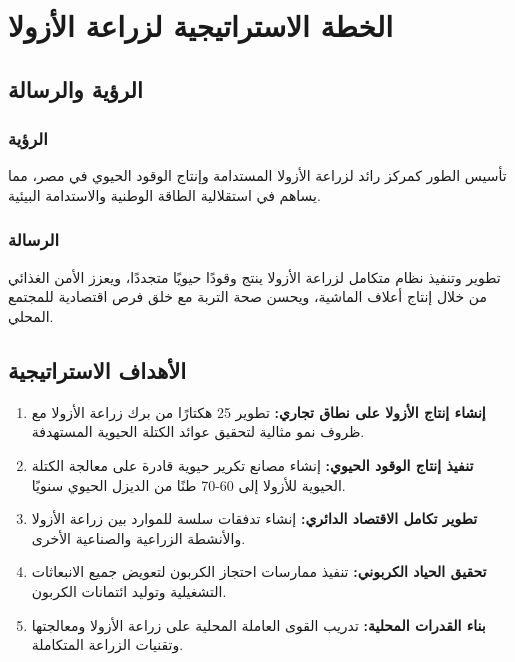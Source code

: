 \section{الخطة الاستراتيجية لزراعة الأزولا}

\subsection{الرؤية والرسالة}

\subsubsection{الرؤية}
تأسيس الطور كمركز رائد لزراعة الأزولا المستدامة وإنتاج الوقود الحيوي في مصر، مما يساهم في استقلالية الطاقة الوطنية والاستدامة البيئية.

\subsubsection{الرسالة}
تطوير وتنفيذ نظام متكامل لزراعة الأزولا ينتج وقودًا حيويًا متجددًا، ويعزز الأمن الغذائي من خلال إنتاج أعلاف الماشية، ويحسن صحة التربة مع خلق فرص اقتصادية للمجتمع المحلي.

\subsection{الأهداف الاستراتيجية}

\begin{enumerate}
    \item \textbf{إنشاء إنتاج الأزولا على نطاق تجاري:} تطوير 25 هكتارًا من برك زراعة الأزولا مع ظروف نمو مثالية لتحقيق عوائد الكتلة الحيوية المستهدفة.
    
    \item \textbf{تنفيذ إنتاج الوقود الحيوي:} إنشاء مصانع تكرير حيوية قادرة على معالجة الكتلة الحيوية للأزولا إلى 60-70 طنًا من الديزل الحيوي سنويًا.
    
    \item \textbf{تطوير تكامل الاقتصاد الدائري:} إنشاء تدفقات سلسة للموارد بين زراعة الأزولا والأنشطة الزراعية والصناعية الأخرى.
    
    \item \textbf{تحقيق الحياد الكربوني:} تنفيذ ممارسات احتجاز الكربون لتعويض جميع الانبعاثات التشغيلية وتوليد ائتمانات الكربون.
    
    \item \textbf{بناء القدرات المحلية:} تدريب القوى العاملة المحلية على زراعة الأزولا ومعالجتها وتقنيات الزراعة المتكاملة.
\end{enumerate}

